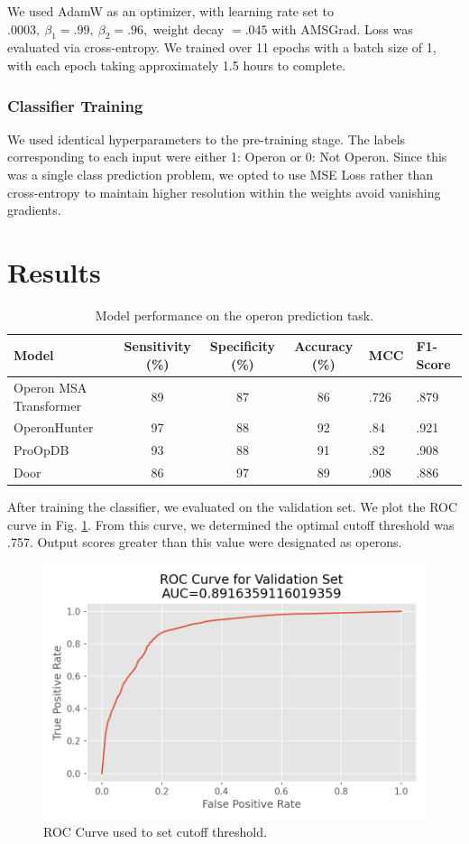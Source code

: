 \documentclass{article}
\begin{document}
We used AdamW \cite{loshchilov_decoupled_2017} as an optimizer, with learning rate set to \(.0003, \ \beta_1 = .99, \ \beta_2 = .96, \) weight decay \( = .045\) with AMSGrad. Loss was evaluated via cross-entropy. We trained over 11 epochs with a batch size of 1, with each epoch taking approximately 1.5 hours to complete.

\subsubsection{Classifier Training}

We used identical hyperparameters to the pre-training stage. The labels corresponding to each input were either 1: Operon or 0: Not Operon. Since this was a single class prediction problem, we opted to use MSE Loss rather than cross-entropy to maintain higher resolution within the weights avoid vanishing gradients.

\section{Results}

\begin{table}[h]
\caption{Model performance on the operon prediction task.}
\label{table:results}
\begin{tabular}{lcccll}
\toprule
Model              & Sensitivity (\%) & Specificity (\%) & Accuracy (\%) & MCC  & F1-Score \\
\midrule
Operon MSA Transformer & 89               & 87               & 86            & .726  & .879        \\
OperonHunter      & 97               & 88               & 92            & .84  & .921     \\
ProOpDB            & 93               & 88               & 91            & .82  & .908     \\
Door               & 86               & 97               & 89            & .908 & .886    
\end{tabular}
\bottomrule
\end{table}


After training the classifier, we evaluated on the validation set. We plot the ROC curve in Fig. \ref{fig:ROC}. From this curve, we determined the optimal cutoff threshold was .757. Output scores greater than this value were designated as operons.

\begin{figure} [h]
  \centering
  \includegraphics[width=.5\textwidth]{images/roc_curve.png}
  \caption{ROC Curve used to set cutoff threshold.}
  \label{fig:ROC}
\end{figure}
\end{document}

